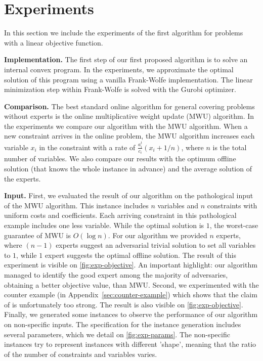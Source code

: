 
\section{Experiments} \label{sec:apx-exp}

In this section we include the experiments of the first algorithm for problems with a linear objective function.

\textbf{Implementation.} The first step of our first proposed algorithm is to solve an internal convex program. In the experiments, we approximate the optimal solution of this program using a vanilla Frank-Wolfe implementation. The linear minimization step within Frank-Wolfe is solved with the Gurobi optimizer.

\textbf{Comparison.} The best standard online algorithm for general covering problems without experts is the online multiplicative weight update (MWU) algorithm. In the experiments we compare our algorithm with the MWU algorithm. When a new constraint arrives in the online problem, the MWU algorithm increases each variable $x_i$ in the constraint with a rate of $\frac{a^t_i}{c_i}(x_i + 1/n)$, where $n$ is the total number of variables. We also compare our results with the optimum offline solution (that knows the whole instance in advance) and the average solution of the experts.

\textbf{Input.} First, we evaluated the result of our algorithm on the pathological input of the MWU algorithm. This instance includes $n$ variables and $n$ constraints with uniform costs and coefficients. Each arriving constraint in this pathological example includes one less variable. While the optimal solution is $1$, the worst-case guarantee of MWU is $O(\log n)$. For our algorithm we provided $n$ experts, where $(n-1)$ experts suggest an adversarial trivial solution to set all variables to $1$, while $1$ expert suggests the optimal offline solution. The result of this experiment is visible on \cref{fig:exp-objective}. An important highlight: our algorithm managed to identify the good expert among the majority of adversaries, obtaining a better objective value, than MWU. Second, we experimented with the counter example (in Appendix~\ref{sec:counter-example}) which shows that the claim of \cite{AnandGe22:Online-Algorithms} is unfortunately too strong. The result is also visible on \cref{fig:exp-objective}. Finally, we generated some instances to observe the performance of our algorithm on non-specific inputs.
The specification for the instance generation includes several parameters, which we detail on \cref{fig:exp-params}. The non-specific instances try to represent instances with different 'shape', meaning that the ratio of the number of constraints and variables varies.

